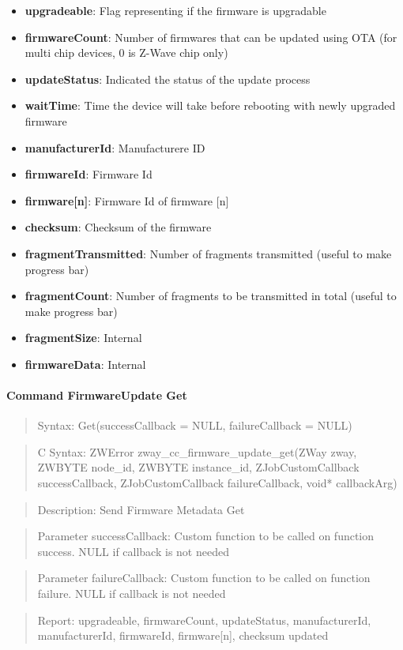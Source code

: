\begin{itemize}
\item \textbf{upgradeable}: Flag representing if the firmware is upgradable
\item \textbf{firmwareCount}: Number of firmwares that can be updated using OTA (for multi chip devices, 0 is Z-Wave chip only)
\item \textbf{updateStatus}: Indicated the status of the update process
\item \textbf{waitTime}: Time the device will take before rebooting with newly upgraded firmware
\item \textbf{manufacturerId}: Manufacturere ID
\item \textbf{firmwareId}: Firmware Id
\item \textbf{firmware[n]}: Firmware Id of firmware [n]
\item \textbf{checksum}: Checksum of the firmware
\item \textbf{fragmentTransmitted}: Number of fragments transmitted (useful to make progress bar)
\item \textbf{fragmentCount}: Number of fragments to be transmitted in total (useful to make progress bar)
\item \textbf{fragmentSize}: Internal
\item \textbf{firmwareData}: Internal
\end{itemize}

\paragraph{Command FirmwareUpdate Get}
\begin{quote}Syntax: Get(successCallback = NULL, failureCallback = NULL)\end{quote}
\begin{quote}C Syntax: ZWError zway\_cc\_firmware\_update\_get(ZWay zway, ZWBYTE node\_id, ZWBYTE instance\_id, ZJobCustomCallback successCallback, ZJobCustomCallback failureCallback, void* callbackArg)\end{quote}
\begin{quote}Description: Send Firmware Metadata Get\end{quote}
\begin{quote}Parameter successCallback: Custom function to be called on function success. NULL if callback is not needed\end{quote}
\begin{quote}Parameter failureCallback: Custom function to be called on function failure. NULL if callback is not needed\end{quote}
\begin{quote}Report: upgradeable, firmwareCount, updateStatus, manufacturerId, manufacturerId, firmwareId, firmware[n], checksum updated\end{quote}

